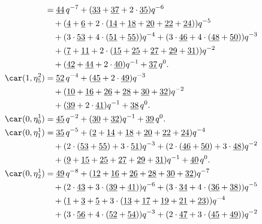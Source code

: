 \begin{align*}
	&=\underline{44}\,q^{-7}+(\underline{33}+\underline{37}+2\cdot\underline{35})q^{-6}\\
	&\quad+(\underline{4}+\underline{6}+2\cdot(\underline{14}+\underline{18}+\underline{20}+\underline{22}+\underline{24}))q^{-5}\\
	&\quad+(3\cdot\underline{53}+4\cdot(\underline{51}+\underline{55}))q^{-4}+(3\cdot\underline{46}+4\cdot(\underline{48}+\underline{50}))q^{-3}\\
	&\quad+(\underline{7}+\underline{11}+2\cdot(\underline{15}+\underline{25}+\underline{27}+\underline{29}+\underline{31}))q^{-2}\\
	&\quad+(\underline{42}+\underline{44}+2\cdot\underline{40})q^{-1}+\underline{37}\,q^0.\\
	\car(1,\eta^{2}_{5})
	&=\underline{52}\,q^{-4}+(\underline{45}+2\cdot\underline{49})q^{-3}\\
	&\quad+(\underline{10}+\underline{16}+\underline{26}+\underline{28}+\underline{30}+\underline{32})q^{-2}\\
	&\quad+(\underline{39}+2\cdot\underline{41})q^{-1}+\underline{38}\,q^0.\\
	\car(0,\eta^{1}_{0})
	&=\underline{45}\,q^{-2}+(\underline{30}+\underline{32})q^{-1}+\underline{39}\,q^0.\\
	\car(0,\eta^{1}_{1})
	&=\underline{35}\,q^{-5}+(\underline{2}+\underline{14}+\underline{18}+\underline{20}+\underline{22}+\underline{24})q^{-4}\\
	&\quad+(2\cdot(\underline{53}+\underline{55})+3\cdot\underline{51})q^{-3}+(2\cdot(\underline{46}+\underline{50})+3\cdot\underline{48})q^{-2}\\
	&\quad+(\underline{9}+\underline{15}+\underline{25}+\underline{27}+\underline{29}+\underline{31})q^{-1}+\underline{40}\,q^0.\\
	\car(0,\eta^{1}_{2})
	&=\underline{49}\,q^{-8}+(\underline{12}+\underline{16}+\underline{26}+\underline{28}+\underline{30}+\underline{32})q^{-7}\\
	&\quad+(2\cdot\underline{43}+3\cdot(\underline{39}+\underline{41}))q^{-6}+(3\cdot\underline{34}+4\cdot(\underline{36}+\underline{38}))q^{-5}\\
	&\quad+(\underline{1}+\underline{3}+\underline{5}+3\cdot(\underline{13}+\underline{17}+\underline{19}+\underline{21}+\underline{23}))q^{-4}\\
	&\quad+(3\cdot\underline{56}+4\cdot(\underline{52}+\underline{54}))q^{-3}+(2\cdot\underline{47}+3\cdot(\underline{45}+\underline{49}))q^{-2}\\

\end{align*}
